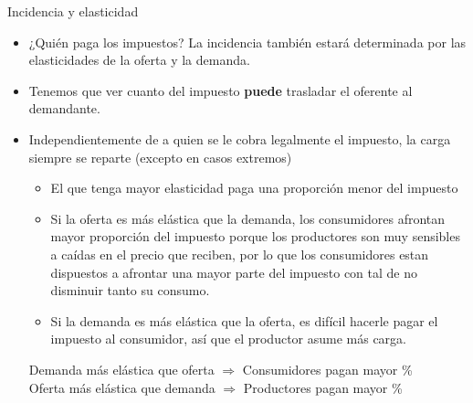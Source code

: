 \documentclass{beamer}
\begin{document}
\begin{frame}{Incidencia y elasticidad}
    \begin{itemize}
        \item ¿Quién paga los impuestos? La incidencia también estará determinada por las elasticidades de la oferta y la demanda. 
        \item Tenemos que ver cuanto del impuesto \textbf{puede} trasladar el oferente al demandante.
        \item Independientemente de a quien se le cobra legalmente el impuesto, la carga siempre se reparte (excepto en casos extremos)
            \begin{itemize}
                \item El que tenga mayor elasticidad paga una proporción menor del impuesto
                \item Si la oferta es más elástica que la demanda, los consumidores afrontan mayor proporción del impuesto porque los productores son muy sensibles a caídas en el precio que reciben, por lo que los consumidores estan dispuestos a afrontar una mayor parte del impuesto con tal de no disminuir tanto su consumo.
                \item Si la demanda es más elástica que la oferta, es difícil hacerle pagar el impuesto al consumidor, así que el productor asume más carga.
            \end{itemize}
        \begin{boxB}
        \small
        \centering
        Demanda más elástica que oferta  $\Longrightarrow$ Consumidores pagan mayor \% \\
        Oferta más elástica que demanda  $\Longrightarrow$ Productores pagan mayor \%
        \end{boxB}
    \end{itemize}
\end{frame}
\end{document}
